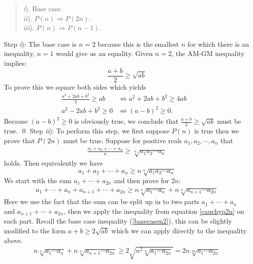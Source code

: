 \documentclass{article}
\begin{document}
	\begin{quote}
		\textit{i}). Base case.\\
		\textit{ii}). $P(n) \Rightarrow P(2n)$.\\
		\textit{iii}). $P(n) \Rightarrow P(n-1)$.
	\end{quote}
	\noindent
	Step \textit{i}): The base case is $n=2$ because this is the smallest $n$ for which there is an inequality, $n=1$ would give us an equality. Given $n=2$, the AM-GM inequality implies:
	\begin{equation}
		\frac{a+b}{2} \geq \sqrt{ab}
		\label{basecasen2}
	\end{equation}
 	\noindent
	To prove this we square both sides which yields
	\begin{align*}
		\frac{a^2+2ab+b^2}{4} \geq ab &\iff a^2+2ab+b^2 \geq 4ab& \\
		a^2-2ab+b^2 \geq 0 &\iff (a-b)^2 \geq 0.&
	\end{align*}
	Because $(a-b)^2 \geq 0$ is obviously true, we conclude that
	$\frac{a+b}{2} \geq \sqrt{ab}$
	must be true. \qed
	\newline
	Step \textit{ii}): To perform this step, we first suppose $P(n)$ is true then we prove that $P(2n)$ must be true. Suppose for positive reals $a_1,a_2, \cdots, a_n$ that
	\begin{align*}
		\frac{a_1+a_2+ \cdots + a_n}{n} \geq \sqrt[n]{a_1a_2 \cdots a_n}
	\end{align*}
	holds. Then equivalently we have
	\begin{equation}
		a_1+a_2+ \cdots + a_n \geq n\sqrt[n]{a_1a_2 \cdots a_n}
		\label{cauchyp2n}
	\end{equation}
	We start with the sum $a_1+\cdots+a_{2n}$ and then prove for $2n$:
	\begin{align*}
		a_1+\cdots+a_n+a_{n+1}+\cdots+a_{2n} \geq n\sqrt[n]{a_1\cdots a_n} + n\sqrt[n]{a_{n+1}\cdots a_{2n}}
	\end{align*}
	Here we use the fact that the sum can be split up in to two parts $a_1 + \cdots + a_n$ and $a_{n+1} + \cdots + a_{2n}$, then we apply the inequality from equation \ref{cauchyp2n} on each part. Recall the base case inequality (\ref{basecasen2}), this can be slightly modified to the form $a+b \geq 2\sqrt{ab}$ which we can apply directly to the inequality above.
	\begin{align*}
		n\sqrt[n]{a_1\cdots a_n} + n\sqrt[n]{a_{n+1}\cdots a_{2n}} \geq 2\sqrt{n^2\sqrt[n]{a_1\cdots a_{2n}}} = 2n\sqrt[2n]{a_1\cdots a_{2n}}
	\end{align*}
\end{document}
